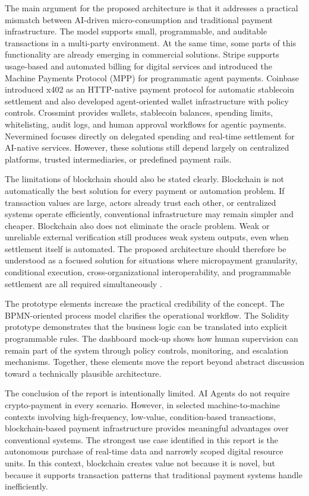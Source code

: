 \documentclass[12pt,a4paper,oneside]{article}
\theoremstyle{definition}
\theoremstyle{plain}
\begin{document}
The main argument for the proposed architecture is that it addresses a practical mismatch between AI-driven micro-consumption and traditional payment infrastructure. The model supports small, programmable, and auditable transactions in a multi-party environment. At the same time, some parts of this functionality are already emerging in commercial solutions. Stripe supports usage-based and automated billing for digital services and introduced the Machine Payments Protocol (MPP) for programmatic agent payments. Coinbase introduced x402 as an HTTP-native payment protocol for automatic stablecoin settlement and also developed agent-oriented wallet infrastructure with policy controls. Crossmint provides wallets, stablecoin balances, spending limits, whitelisting, audit logs, and human approval workflows for agentic payments. Nevermined focuses directly on delegated spending and real-time settlement for AI-native services. However, these solutions still depend largely on centralized platforms, trusted intermediaries, or predefined payment rails.

The limitations of blockchain should also be stated clearly. Blockchain is not automatically the best solution for every payment or automation problem. If transaction values are large, actors already trust each other, or centralized systems operate efficiently, conventional infrastructure may remain simpler and cheaper. Blockchain also does not eliminate the oracle problem. Weak or unreliable external verification still produces weak system outputs, even when settlement itself is automated. The proposed architecture should therefore be understood as a focused solution for situations where micropayment granularity, conditional execution, cross-organizational interoperability, and programmable settlement are all required simultaneously \citep{krueger2026oracles,defilippi2018law}.

The prototype elements increase the practical credibility of the concept. The BPMN-oriented process model clarifies the operational workflow. The Solidity prototype demonstrates that the business logic can be translated into explicit programmable rules. The dashboard mock-up shows how human supervision can remain part of the system through policy controls, monitoring, and escalation mechanisms. Together, these elements move the report beyond abstract discussion toward a technically plausible architecture.

The conclusion of the report is intentionally limited. AI Agents do not require crypto-payment in every scenario. However, in selected machine-to-machine contexts involving high-frequency, low-value, condition-based transactions, blockchain-based payment infrastructure provides meaningful advantages over conventional systems. The strongest use case identified in this report is the autonomous purchase of real-time data and narrowly scoped digital resource units. In this context, blockchain creates value not because it is novel, but because it supports transaction patterns that traditional payment systems handle inefficiently.
\newpage


\end{document}
